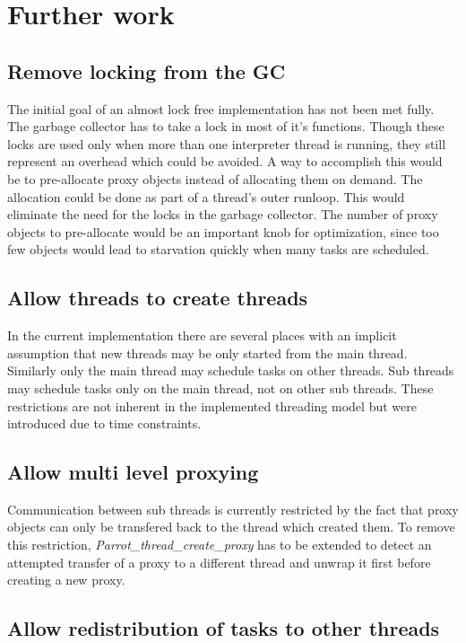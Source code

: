 \documentclass[bachelor,english]{hgbthesis}
\begin{document}
\section{Further work}

\subsection{Remove locking from the GC}

The initial goal of an almost lock free implementation has not been met fully. The garbage collector has to take a lock in most of it's functions. Though these locks are used only when more than one interpreter thread is running, they still represent an overhead which could be avoided. A way to accomplish this would be to pre-allocate proxy objects instead of allocating them on demand. The allocation could be done as part of a thread's outer runloop. This would eliminate the need for the locks in the garbage collector. The number of proxy objects to pre-allocate would be an important knob for optimization, since too few objects would lead to starvation quickly when many tasks are scheduled.

\subsection{Allow threads to create threads}

In the current implementation there are several places with an implicit assumption that new threads may be only started from the main thread. Similarly only the main thread may schedule tasks on other threads. Sub threads may schedule tasks only on the main thread, not on other sub threads. These restrictions are not inherent in the implemented threading model but were introduced due to time constraints.

\subsection{Allow multi level proxying}

Communication between sub threads is currently restricted by the fact that proxy objects can only be transfered back to the thread which created them. To remove this restriction, \textit{Parrot\_thread\_create\_proxy} has to be extended to detect an attempted transfer of a proxy to a different thread and unwrap it first before creating a new proxy.

\subsection{Allow redistribution of tasks to other threads}
\end{document}
